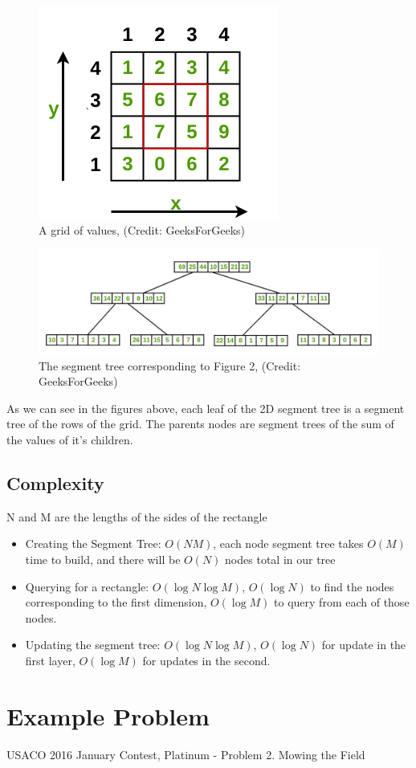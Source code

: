 \documentclass{article}
\begin{document}
    \begin{figure}[h]
        \centering
        \includegraphics[scale = 0.4]{Images/image2.png}
        \caption{A grid of values, (Credit: GeeksForGeeks)}
    \end{figure}
    
    \begin{figure}[h]
        \centering
        \includegraphics[scale = 0.35]{Images/image3.png}
        \caption{The segment tree corresponding to Figure 2, (Credit: GeeksForGeeks)}
    \end{figure}
    
    \hspace{1em} \quad As we can see in the figures above, each leaf of the 2D segment tree is a segment tree of the rows of the grid. The parents nodes are segment trees of the sum of the values of it's children. 
    
    \subsection{Complexity}
    N and M are the lengths of the sides of the rectangle
    \begin{itemize}
      \item Creating the Segment Tree: $O(NM)$, each node segment tree takes $O(M)$ time to build, and there will be $O(N)$ nodes total in our tree
      \item Querying for a rectangle: $O(\log N \log M)$, $O(\log N)$ to find the nodes corresponding to the first dimension, $O(\log M)$ to query from each of those nodes.
      \item Updating the segment tree: $O(\log N \log M)$, $O(\log N)$ for update in the first layer, $O(\log M)$ for updates in the second.
    \end{itemize}
    
\section{Example Problem}
    USACO 2016 January Contest, Platinum - Problem 2. Mowing the Field
\end{document}
